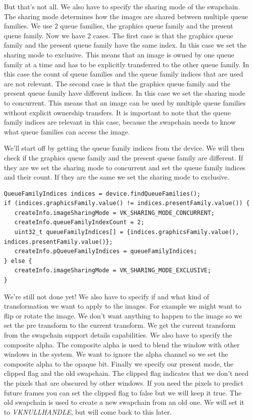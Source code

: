\documentclass[12pt]{report} \usepackage{preamble}
\begin{document}
But that's not all. We also have to specify the sharing mode of the swapchain. The sharing mode
determines how the images are shared between multiple queue families. We use 2 queue families, the
graphics queue family and the present queue family. Now we have 2 cases. The first case is that the
graphics queue family and the present queue family have the same index. In this case we set the sharing
mode to exclusive. This means that an image is owned by one queue family at a time and has to be
explicitly transferred to the other queue family. In this case the count of queue families and the
queue family indices that are used are not relevant. The second case is that the graphics queue family
and the present queue family have different indices. In this case we set the sharing mode to concurrent.
This means that an image can be used by multiple queue families without explicit ownership transfers.
It is important to note that the queue family indices are relevant in this case, because the swapchain needs
to know what queue families can access the image.

We'll start off by getting the queue family indices from the device. We will then check if the graphics
queue family and the present queue family are different. If they are we set the sharing mode to concurrent
and set the queue family indices and their count. If they are the same we set the sharing mode to exclusive.

\begin{lstlisting}[Language=C++]
QueueFamilyIndices indices = device.findQueueFamilies();
if (indices.graphicsFamily.value() != indices.presentFamily.value()) {
   createInfo.imageSharingMode = VK_SHARING_MODE_CONCURRENT;
   createInfo.queueFamilyIndexCount = 2;
   uint32_t queueFamilyIndices[] = {indices.graphicsFamily.value(), indices.presentFamily.value()};
   createInfo.pQueueFamilyIndices = queueFamilyIndices;
} else {
   createInfo.imageSharingMode = VK_SHARING_MODE_EXCLUSIVE;
}
\end{lstlisting}

We're still not done yet! We also have to specify if and what kind of transformation we want
to apply to the images. For example we might want to flip or rotate the image. We don't want
anything to happen to the image so we set the pre transform to the current transform. We get
the current transform from the swapchain support details capabilities. We also have to specify
the composite alpha. The composite alpha is used to blend the window with other windows in the
system. We want to ignore the alpha channel so we set the composite alpha to the opaque bit.
Finally we specify our present mode, the clipped flag and the old swapchain. The clipped flag
indicates that we don't need the pixels that are obscured by other windows. If you need the
pixels to predict future frames you can set the clipped flag to false but we will keep it true.
The old swapchain is used to create a new swapchain from an old one. We will set it to
\textit{VK\textunderscore NULL\textunderscore HANDLE}, but will come back to this later.
\end{document}
